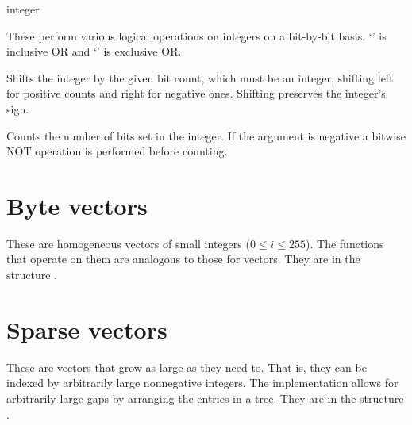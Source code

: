 \begin{protos}
 {integer}
\end{protos}
\noindent
These perform various logical operations on integers on a bit-by-bit
basis. `' is inclusive OR and `' is exclusive OR.

\begin{protos}
\end{protos}
\noindent Shifts the integer by the given bit count, which must be an integer,
 shifting left for positive counts and right for negative ones.
Shifting preserves the integer's sign.

\begin{protos}
\end{protos}
\noindent Counts the number of bits set in the integer.
If the argument is negative a bitwise NOT operation is performed
 before counting.

\section{Byte vectors}

These are homogeneous vectors of small integers ($0 \le i \le 255$).
The functions that operate on them are analogous to those for vectors.
They are in the structure .

\begin{protos}
\end{protos}

\section{Sparse vectors}

These are vectors that grow as large as they need to.  That is, they
can be indexed by arbitrarily large nonnegative integers.  The
implementation allows for arbitrarily large gaps by arranging the
entries in a tree.  They are in the structure .

